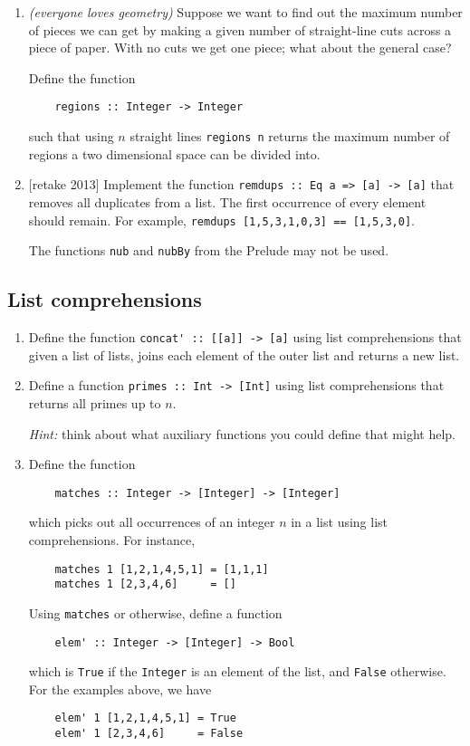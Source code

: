 \documentclass{article}
\def\code#1{\texttt{#1}}
\begin{document}
\begin{enumerate}
\item \cite[p. 85]{thompson} \textit{(everyone loves geometry)} Suppose we want to find out the maximum number of pieces we can get by making a given number of straight-line cuts across a piece of paper. With no cuts we get one piece; what about the general case? \par
Define the function
\begin{verbatim}
    regions :: Integer -> Integer
\end{verbatim}
such that using $n$ straight lines \verb|regions n| returns the maximum number of regions a two dimensional space can be divided into.

\item {[retake 2013]} Implement the function \code{remdups :: Eq a => [a] -> [a]} that removes all duplicates from a list. The first occurrence of every element should remain. For example, \code{remdups [1,5,3,1,0,3] == [1,5,3,0]}. \par
The functions \code{nub} and \code{nubBy} from the Prelude may not be used.
\end{enumerate}

\subsection{List comprehensions}
\begin{enumerate}
\item Define the function \verb|concat' :: [[a]] -> [a]| using list comprehensions that given a list of lists, joins each element of the outer list and returns a new list.

\item Define a function \verb|primes :: Int -> [Int]| using list comprehensions that returns all primes up to $n$. \par
\textit{Hint:} think about what auxiliary functions you could define that might help.

\item \cite[p. 115]{thompson} Define the function
\begin{verbatim}
    matches :: Integer -> [Integer] -> [Integer]
\end{verbatim}
which picks out all occurrences of an integer $n$ in a list using list comprehensions. For instance,
\begin{verbatim}
    matches 1 [1,2,1,4,5,1] = [1,1,1]
    matches 1 [2,3,4,6]     = []
\end{verbatim}
Using \verb|matches| or otherwise, define a function
\begin{verbatim}
    elem' :: Integer -> [Integer] -> Bool
\end{verbatim}
which is \verb|True| if the \verb|Integer| is an element of the list, and \verb|False| otherwise. For the examples above, we have
\begin{verbatim}
    elem' 1 [1,2,1,4,5,1] = True
    elem' 1 [2,3,4,6]     = False
\end{verbatim}
\end{enumerate}
\end{document}
